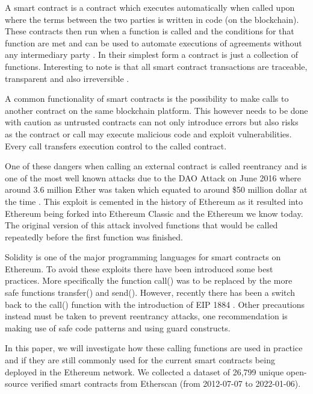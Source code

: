 \documentclass[10pt,conference]{IEEEtran}
\newcommand{\totalContracts}{26,799\xspace}
\begin{document}
A smart contract is a contract which executes automatically when called upon where the terms between the two parties is written in code (on the blockchain). These contracts then run when a function is called and the conditions for that function are met and can be used to automate executions of agreements without any intermediary party \cite{criminal, 10.1145/2993600.2993611, smarter}. In their simplest form a contract is just a collection of functions. Interesting to note is that all smart contract transactions are traceable, transparent and also irreversible \cite{smart_inspect, smarter}.

A common functionality of smart contracts is the possibility to make calls to another contract on the same blockchain platform. This however needs to be done with caution as untrusted contracts can not only introduce errors but also risks as the contract or call may execute malicious code and exploit vulnerabilities. Every call transfers execution control to the called contract.

One of these dangers when calling an external contract is called reentrancy and is one of the most well known attacks due to the DAO Attack on June 2016 where around 3.6 million Ether was taken which equated to around \$50 million dollar at the time \cite{10.1007/978-3-662-54455-6_8}. This exploit is cemented in the history of Ethereum as it resulted into Ethereum being forked into Ethereum Classic and the Ethereum we know today. The original version of this attack involved functions that would be called repeatedly before the first function was finished. 

Solidity is one of the major programming languages for smart contracts on Ethereum. To avoid these exploits there have been introduced some best practices. More specifically the function call() was to be replaced by the more safe functions transfer() and send().  However, recently there has been a switch back to the call() function with the introduction of EIP 1884 \cite{eip1884}.  Other precautions instead must be taken to prevent reentrancy attacks, one recommendation is making use of safe code patterns and using guard constructs. 

In this paper, we will investigate how these calling functions are used in practice and if they are still commonly used for the current smart contracts being deployed in the Ethereum network.  We collected a dataset of \totalContracts unique open-source verified smart contracts from Etherscan (from 2012-07-07 to 2022-01-06). 
\end{document}
